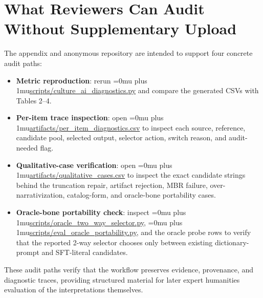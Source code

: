\documentclass{article}
\newcommand{\pathcode}[1]{{\begingroup\Urlmuskip=0mu plus 1mu\url{#1}\endgroup}}
\begin{document}
\section{What Reviewers Can Audit Without Supplementary Upload}

The appendix and anonymous repository are intended to support four concrete audit paths:
\begin{itemize}
    \item \textbf{Metric reproduction}: rerun \pathcode{scripts/culture_ai_diagnostics.py} and compare the generated CSVs with Tables 2--4.
    \item \textbf{Per-item trace inspection}: open \pathcode{artifacts/per_item_diagnostics.csv} to inspect each source, reference, candidate pool, selected output, selector action, switch reason, and audit-needed flag.
    \item \textbf{Qualitative-case verification}: open \pathcode{artifacts/qualitative_cases.csv} to inspect the exact candidate strings behind the truncation repair, artifact rejection, MBR failure, over-narrativization, catalog-form, and oracle-bone portability cases.
    \item \textbf{Oracle-bone portability check}: inspect \pathcode{scripts/oracle_two_way_selector.py}, \pathcode{scripts/eval_oracle_portability.py}, and the oracle probe rows to verify that the reported 2-way selector chooses only between existing dictionary-prompt and SFT-literal candidates.
\end{itemize}

These audit paths verify that the workflow preserves evidence, provenance, and diagnostic traces, providing structured material for later expert humanities evaluation of the interpretations themselves.
\end{document}
